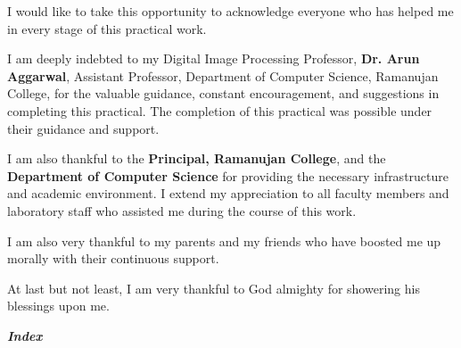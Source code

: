 \documentclass[12pt]{article}
\begin{document}
\vspace{16pt}
{\large
I would like to take this opportunity to acknowledge everyone who has helped me in every stage of this practical work.

I am deeply indebted to my Digital Image Processing Professor, \textbf{Dr. Arun Aggarwal}, Assistant Professor, Department of Computer Science, Ramanujan College, for the valuable guidance, constant encouragement, and suggestions in completing this practical. The completion of this practical was possible under their guidance and support.

I am also thankful to the \textbf{Principal, Ramanujan College}, and the \textbf{Department of Computer Science} for providing the necessary infrastructure and academic environment. I extend my appreciation to all faculty members and laboratory staff who assisted me during the course of this work.

I am also very thankful to my parents and my friends who have boosted me up morally with their continuous support.

At last but not least, I am very thankful to God almighty for showering his blessings upon me.
}

\newpage
\begin{center}
{\fontsize{35pt}{30pt}\selectfont\bfseries\itshape\color{rcblue} Index}
\end{center}

\vspace{6pt}
\end{document}
